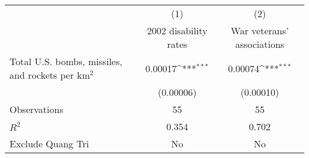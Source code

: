 {
\def\sym#1{\ifmmode^{#1}\else\(^{#1}\)\fi}
\begin{tabular}{l*{2}{c}}
\toprule
                    &\multicolumn{1}{c}{(1)}&\multicolumn{1}{c}{(2)}\\
                    &\multicolumn{1}{c}{2002 disability rates}&\multicolumn{1}{c}{War veterans' associations}\\
\midrule
Total U.S. bombs, missiles, and rockets per km$^2$&     0.00017\sym{***}&     0.00074\sym{***}\\
                    &   (0.00006)         &   (0.00010)         \\
\midrule
Observations        &          55         &          55         \\
\(R^{2}\)           &       0.354         &       0.702         \\
Exclude Quang Tri   &          No         &          No         \\
\bottomrule
\end{tabular}
}
